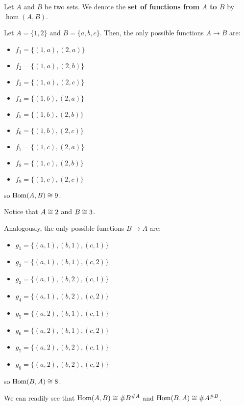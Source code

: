 \begin{df}
	Let $A$ and $B$ be two sets. We denote the \textbf{set of functions from $A$ to $B$} by $\hom(A,B)$.
\end{df}

\begin{ex}
	Let $A=\{1,2\}$ and $B=\{a,b,c\}$. Then, the only possible functions $A\to B$ are:
	\begin{multicols}{3}
	\begin{itemize}
		\item $f_1=\{(1,a),(2,a)\}$
		\item $f_2=\{(1,a),(2,b)\}$
		\item $f_3=\{(1,a),(2,c)\}$
		\item $f_4=\{(1,b),(2,a)\}$
		\item $f_5=\{(1,b),(2,b)\}$
		\item $f_6=\{(1,b),(2,c)\}$
		\item $f_7=\{(1,c),(2,a)\}$
		\item $f_8=\{(1,c),(2,b)\}$
		\item $f_9=\{(1,c),(2,c)\}$
	\end{itemize}
\end{multicols}so $\mathrm{Hom}(A,B)\cong 9$.

Notice that $A\cong 2$ and $B\cong 3$.

\bigskip
Analogously, the only possible functions $B\to A$ are:

\begin{multicols}{2}
	\begin{itemize}
		\item $g_1=\{(a,1),(b,1),(c,1)\}$
		\item $g_2=\{(a,1),(b,1),(c,2)\}$
		\item $g_3=\{(a,1),(b,2),(c,1)\}$
		\item $g_4=\{(a,1),(b,2),(c,2)\}$
		\item $g_5=\{(a,2),(b,1),(c,1)\}$
		\item $g_6=\{(a,2),(b,1),(c,2)\}$
		\item $g_7=\{(a,2),(b,2),(c,1)\}$
		\item $g_8=\{(a,2),(b,2),(c,2)\}$
	\end{itemize}
\end{multicols}so $\mathrm{Hom}(B,A)\cong 8$.

We can readily see that $\mathrm{Hom}(A,B)\cong \#B^{\#A}$ and $\mathrm{Hom}(B,A)\cong \#A^{\#B}$.
\end{ex}

